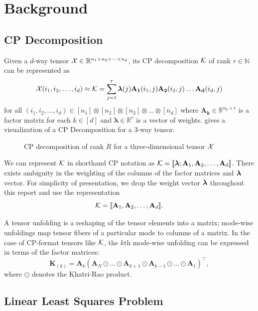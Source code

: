 \documentclass{article}
\newcommand{\mat}[1]{\mathbf{#1}}
\newcommand{\V}[2][]{\bm{#1{\mathbf{\MakeLowercase{#2}}}}} 		%
\newcommand{\T}[2][]{#1{\mathbf{\cal{#2}}}} 						%
\begin{document}
\section{Background}
\subsection{CP Decomposition}
Given a $d$-way tensor $\T{X} \in \mathbb{R}^{n_1\times n_2\times \dots \times n_d}$, its
CP decomposition $\T{K}$ of rank $r \in \mathbb{N}$ can be represented as 
\begin{equation}
\label{eq:CP}
\T{X}(i_1,i_2,\dots, i_d) \approx \T{K} = \sum^{r}_{j=1} \V{\lambda}(j) \mat{A_1}(i_1,j)\mat{A_2}(i_2,j) \dots \mat{A_d}(i_d,j)
\end{equation}
for all $(i_1,i_2,\dots, i_d) \in [n_1] \otimes [n_2] \otimes [n_3] \otimes \dots \otimes [n_d]$ where $\mat{A_k} \in \mathbb{R}^{n_k \times r}$ is a factor matrix for each $k \in [d]$ and $\bm{\lambda}\in\mathbb{R}^r$ is a vector of weights. 
 gives a visualization of a CP Decomposition for a 3-way tensor.

\begin{figure}[ht!]
\centering

\caption{CP decomposition of rank $R$ for a three-dimensional tensor $\T{X}$ \label{fig:3d-cp-decomp}}
\end{figure}
We can represent $\T[]{K}$ in shorthand CP notation as $\T{K} = [\![\V{\lambda};\mat{A}_1,\mat{A}_2, \dots,\mat{A}_d ]\!]$. 
There exists ambiguity in the weighting of the columns of the factor matrices and $\V{\lambda}$ vector.
For simplicity of presentation, we drop the weight vector $\V{\lambda}$ throughout this report and use the representation
$$\T{K} = [\![\mat{A}_1,\mat{A}_2, \dots,\mat{A}_d ]\!].$$

A tensor unfolding is a reshaping of the tensor elements into a matrix; mode-wise unfoldings map tensor fibers of a particular mode to columns of a matrix.
In the case of CP-format tensors like $\T{K}$, the $k$th mode-wise unfolding can be expressed in terms of the factor matrices:
$$\mat{K}_{(k)} = \mat{A}_k (\mat{A}_N \odot \dots \odot \mat{A}_{k+1} \odot \mat{A}_{k-1} \odot \dots \odot \mat{A}_1)^\top,$$
where $\odot$ denotes the Khatri-Rao product.

\subsection{Linear Least Squares Problem}
\label{sec:LS}
\end{document}
